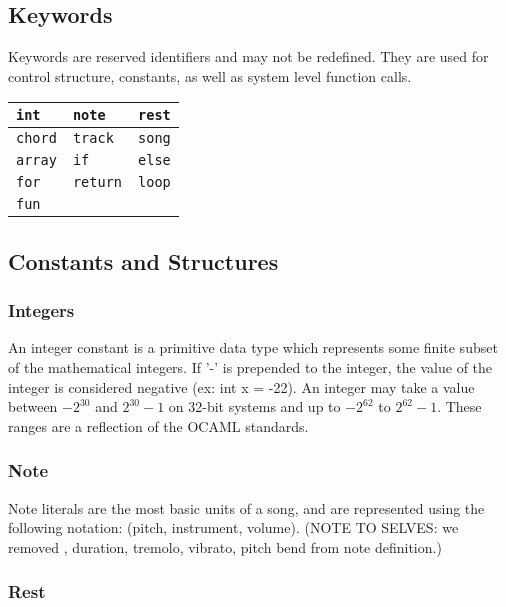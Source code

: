 \documentclass[letterpaper]{article}
\begin{document}
\begin{samepage}
\subsection{Keywords}
Keywords are reserved identifiers and may not be redefined. They are used for control structure, constants, as well as system level function calls.
\begin{table}[H]
\centering
\begin{tabularx}{.75\textwidth}{|X|X|X|}
\hline
\texttt{int} & \texttt{note} & \texttt{rest} \\
\hline
\texttt{chord} & \texttt{track} & \texttt{song} \\
\hline
\texttt{array} & \texttt{if} & \texttt{else} \\
\hline
\texttt{for} & \texttt{return} & \texttt{loop} \\
\hline
\texttt{fun} & & \\
\hline
\end{tabularx}
\end{table}
\end{samepage}

\subsection{Constants and Structures}
\subsubsection{Integers}
An integer constant is a primitive data type which represents some finite subset of the mathematical integers. If '-' is prepended to the integer, the value of the integer is considered negative (ex: int x = -22). An integer may take a value between $−2^{30}$ and $2^{30}−1$ on 32-bit systems and up to $−2^{62}$ to $2^{62}−1$. These ranges are a reflection of the OCAML standards.
\subsubsection{Note}
Note literals are the most basic units of a song, and are represented using the following notation: (pitch, instrument, volume). (NOTE TO SELVES: we removed , duration, tremolo, vibrato, pitch bend from note definition.)
\subsubsection{Rest}
\end{document}
